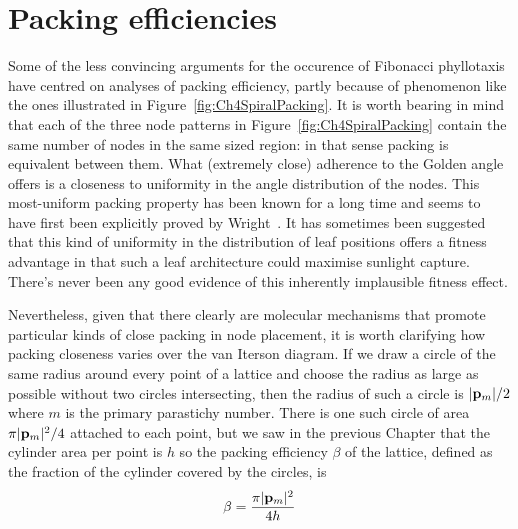 \section{Packing efficiencies}
Some of the less convincing arguments for the occurence of Fibonacci phyllotaxis have centred on analyses of packing efficiency, partly because of phenomenon like the ones illustrated in Figure~\ref{fig:Ch4SpiralPacking}.
%
It is worth bearing in mind that each of the three node patterns in Figure~\ref{fig:Ch4SpiralPacking} contain the same number of nodes in the same sized region: in that sense packing is equivalent between them. What (extremely close) adherence to the Golden angle offers is a closeness to uniformity in the angle distribution of the nodes. This most-uniform packing property has been known for a long time and seems to have first been explicitly proved by Wright~\cite{wrightMostThoroughUniform1859}. It has sometimes been suggested that this kind of uniformity in the distribution of leaf positions offers a fitness advantage in that such a leaf architecture could maximise sunlight capture. There's never been any good evidence of this inherently implausible fitness effect.

Nevertheless, given that there clearly are molecular mechanisms that promote particular kinds of close packing in node placement, it is worth clarifying how packing closeness varies over the van Iterson diagram.  If we  draw a circle of the same radius around every point of a lattice and choose the radius as large as possible without two circles intersecting, then the radius of such a circle is $|{\mathbf p}_{m}|/2$ where $m$ is the primary parastichy number. There is one such circle of area $ {\pi |{\mathbf p}_{m}|^2 }/{4}$ attached to each point, but we saw in the previous Chapter that the cylinder area per point is $h$ so  the packing efficiency $\beta$ of the lattice, defined as the fraction of the cylinder covered by the circles, is
\[
\beta = \frac{ \pi |{\mathbf p}_{m}|^2 }{4 h}
\]


